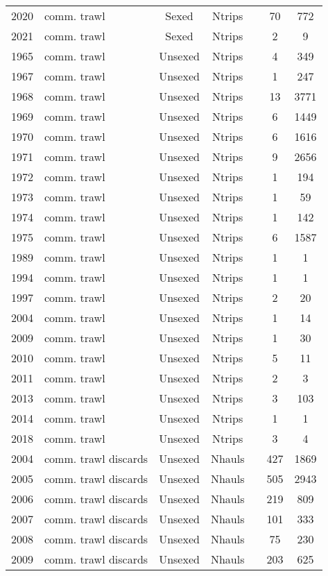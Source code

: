 \begin{longtable}[t]{c>{\centering\arraybackslash}p{3cm}ccccc}
2020 & comm. trawl & Sexed & Ntrips &  & 70 & 772\\
2021 & comm. trawl & Sexed & Ntrips &  & 2 & 9\\
1965 & comm. trawl & Unsexed & Ntrips &  & 4 & 349\\
1967 & comm. trawl & Unsexed & Ntrips &  & 1 & 247\\
1968 & comm. trawl & Unsexed & Ntrips &  & 13 & 3771\\
1969 & comm. trawl & Unsexed & Ntrips &  & 6 & 1449\\
1970 & comm. trawl & Unsexed & Ntrips &  & 6 & 1616\\
1971 & comm. trawl & Unsexed & Ntrips &  & 9 & 2656\\
1972 & comm. trawl & Unsexed & Ntrips &  & 1 & 194\\
1973 & comm. trawl & Unsexed & Ntrips &  & 1 & 59\\
1974 & comm. trawl & Unsexed & Ntrips &  & 1 & 142\\
1975 & comm. trawl & Unsexed & Ntrips &  & 6 & 1587\\
1989 & comm. trawl & Unsexed & Ntrips &  & 1 & 1\\
1994 & comm. trawl & Unsexed & Ntrips &  & 1 & 1\\
1997 & comm. trawl & Unsexed & Ntrips &  & 2 & 20\\
2004 & comm. trawl & Unsexed & Ntrips &  & 1 & 14\\
2009 & comm. trawl & Unsexed & Ntrips &  & 1 & 30\\
2010 & comm. trawl & Unsexed & Ntrips &  & 5 & 11\\
2011 & comm. trawl & Unsexed & Ntrips &  & 2 & 3\\
2013 & comm. trawl & Unsexed & Ntrips &  & 3 & 103\\
2014 & comm. trawl & Unsexed & Ntrips &  & 1 & 1\\
2018 & comm. trawl & Unsexed & Ntrips &  & 3 & 4\\
2004 & comm. trawl discards & Unsexed & Nhauls &  & 427 & 1869\\
2005 & comm. trawl discards & Unsexed & Nhauls &  & 505 & 2943\\
2006 & comm. trawl discards & Unsexed & Nhauls &  & 219 & 809\\
2007 & comm. trawl discards & Unsexed & Nhauls &  & 101 & 333\\
2008 & comm. trawl discards & Unsexed & Nhauls &  & 75 & 230\\
2009 & comm. trawl discards & Unsexed & Nhauls &  & 203 & 625\\

\end{longtable}
